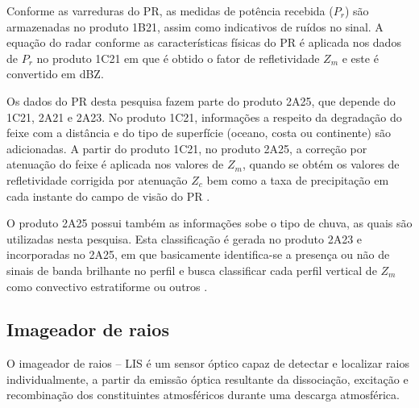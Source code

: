 Conforme as varreduras do PR, as medidas de  potência recebida ($P_r$) são armazenadas no produto 1B21, assim como indicativos de ruídos no sinal. A equação do radar conforme as características físicas do PR é aplicada nos dados de $P_r$ no produto 1C21 em que é obtido o fator de refletividade $Z_m$ e este é convertido em dBZ. 

Os dados do PR desta pesquisa fazem parte do produto 2A25, que depende do 1C21, 2A21 e 2A23. No produto 1C21, informações a respeito da  degradação do feixe com a distância e do tipo de superfície (oceano, costa ou continente) são adicionadas. A partir do produto 1C21, no produto 2A25, a correção por atenuação do feixe é aplicada nos valores de $Z_m$, quando se obtém os valores de refletividade corrigida por atenuação $Z_c$ bem como a taxa de precipitação em cada instante do campo de visão do PR \cite{iguchi1994atenua,meneghini2000,iguchi2000rain}.   

O produto 2A25 possui também as informações sobe o tipo de chuva, as quais são utilizadas nesta pesquisa. Esta classificação é gerada no produto 2A23 e incorporadas no 2A25, em que basicamente identifica-se a presença ou não de sinais de banda brilhante no perfil e busca classificar cada perfil vertical de $Z_m$ como convectivo estratiforme ou outros \cite{awaka1997}. 

      

\subsection{Imageador de raios}

O imageador de raios -- LIS  é um sensor óptico capaz de detectar e localizar raios individualmente, a partir da emissão óptica resultante da dissociação, excitação e recombinação dos constituintes atmosféricos durante uma descarga atmosférica. 

